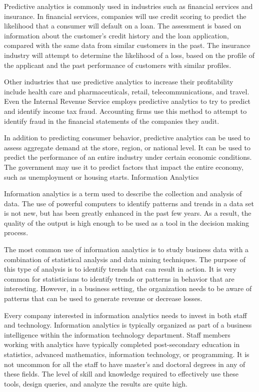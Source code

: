 Predictive analytics is commonly used in industries such as financial services and insurance. In financial services, companies will use credit scoring to predict the likelihood that a consumer will default on a loan. The assessment is based on information about the customer’s credit history and the loan application, compared with the same data from similar customers in the past. The insurance industry will attempt to determine the likelihood of a loss, based on the profile of the applicant and the past performance of customers with similar profiles.
 
Other industries that use predictive analytics to increase their profitability include health care and pharmaceuticals, retail, telecommunications, and travel. Even the Internal Revenue Service employs predictive analytics to try to predict and identify income tax fraud. Accounting firms use this method to attempt to identify fraud in the financial statements of the companies they audit.
 
In addition to predicting consumer behavior, predictive analytics can be used to assess aggregate demand at the store, region, or national level. It can be used to predict the performance of an entire industry under certain economic conditions. The government may use it to predict factors that impact the entire economy, such as unemployment or housing starts.
Information Analytics

Information analytics is a term used to describe the collection and analysis of data. The use of powerful computers to identify patterns and trends in a data set is not new, but has been greatly enhanced in the past few years. As a result, the quality of the output is high enough to be used as a tool in the decision making process.
 
The most common use of information analytics is to study business data with a combination of statistical analysis and data mining techniques. The purpose of this type of analysis is to identify trends that can result in action. It is very common for statisticians to identify trends or patterns in behavior that are interesting. However, in a business setting, the organization needs to be aware of patterns that can be used to generate revenue or decrease losses.
 
Every company interested in information analytics needs to invest in both staff and technology. Information analytics is typically organized as part of a business intelligence within the information technology department. Staff members working with analytics have typically completed post-secondary education in statistics, advanced mathematics, information technology, or programming. It is not uncommon for all the staff to have master's and doctoral degrees in any of these fields. The level of skill and knowledge required to effectively use these tools, design queries, and analyze the results are quite high.
 
